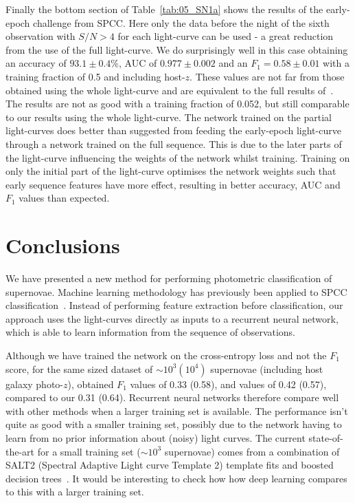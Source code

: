 \documentclass[twocolumn]{aastex61}
\begin{document}
Finally the bottom section of Table~\ref{tab:05_SN1a} shows the results of the early-epoch challenge from SPCC. Here only the data before the night of the sixth observation with $S/N>4$ for each light-curve can be used - a great reduction from the use of the full light-curve. We do surprisingly well in this case obtaining an accuracy of $93.1\pm0.4\%$, AUC of $0.977\pm0.002$ and an $F_1=0.58\pm 0.01$ with a training fraction of 0.5 and including host-$z$. These values are not far from those obtained using the whole light-curve and are equivalent to the full results of~\cite{Karpenka:2012pm}. The results are not as good with a training fraction of 0.052, but still comparable to our results using the whole light-curve. The network trained on the partial light-curves does better than suggested from feeding the early-epoch light-curve through a network trained on the full sequence. This is due to the later parts of the light-curve influencing the weights of the network whilst training. Training on only the initial part of the light-curve optimises the network weights such that early sequence features have more effect, resulting in better accuracy, AUC and $F_1$ values than expected.

\section{Conclusions}

We have presented a new method for performing photometric classification of supernovae. Machine learning methodology has previously been applied to SPCC classification~\cite{Newling:2010bp, Karpenka:2012pm, Lochner:2016hbn}. Instead of performing feature extraction before classification, our approach uses the light-curves directly as inputs to a recurrent neural network, which is able to learn information from the sequence of observations.

Although we have trained the network on the cross-entropy loss and not the $F_1$ score, for the same sized dataset of $\sim10^3 (10^4)$ supernovae (including host galaxy photo-$z$), \cite{Karpenka:2012pm} obtained $F_1$ values of 0.33 (0.58), and \cite{Newling:2010bp} values of 0.42 (0.57), compared to our  0.31 (0.64). Recurrent neural networks  therefore compare well with other methods when a larger training  set is available. The performance isn't  quite as good with a smaller training set, possibly due to the network having to learn from no prior information about (noisy) light curves. The current state-of-the-art for a small training set ($\sim10^3$ supernovae) comes from a combination of SALT2 (Spectral Adaptive Light curve Template 2) template fits and boosted decision trees~\cite{Lochner:2016hbn}. It would be interesting to check how how deep learning compares to this with a larger training set.
\end{document}
